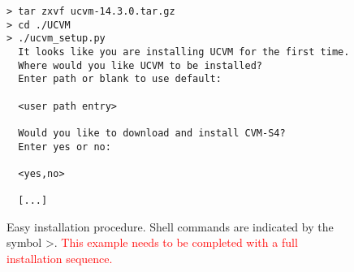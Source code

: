 

\begin{figure}[th]
\begin{lstlisting}[frame=single,basewidth={0.5em,0.4em},backgroundcolor=\color{mylistingbkgd},basicstyle=\ttfamily\footnotesize,breaklines=true]
> tar zxvf ucvm-14.3.0.tar.gz
> cd ./UCVM
> ./ucvm_setup.py
  It looks like you are installing UCVM for the first time.
  Where would you like UCVM to be installed?
  Enter path or blank to use default: 

  <user path entry>

  Would you like to download and install CVM-S4?
  Enter yes or no: 

  <yes,no>

  [...]
\end{lstlisting}
\caption{Easy installation procedure. Shell commands are indicated by the symbol \textgreater. \textcolor{red}{This example needs to be completed with a full installation sequence.}}
\label{fig:instaeasy}
\end{figure}